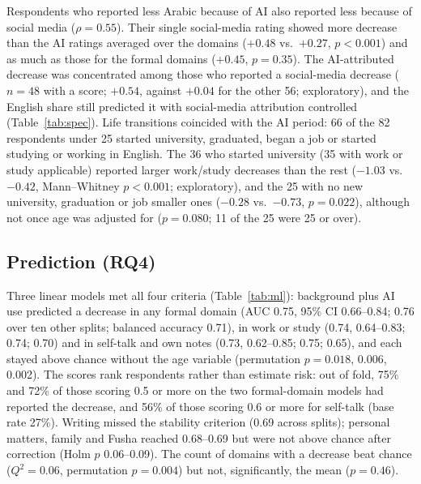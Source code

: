 \documentclass[conference]{IEEEtran}
\begin{document}
Respondents who reported less Arabic because of AI also reported less because of social media ($\rho=0.55$). Their single social-media rating showed more decrease than the AI ratings averaged over the domains ($+0.48$ vs.\ $+0.27$, $p<0.001$) and as much as those for the formal domains ($+0.45$, $p=0.35$). The AI-attributed decrease was concentrated among those who reported a social-media decrease ($n=48$ with a score; $+0.54$, against $+0.04$ for the other 56; exploratory), and the English share still predicted it with social-media attribution controlled (Table~\ref{tab:spec}). Life transitions coincided with the AI period: 66 of the 82 respondents under 25 started university, graduated, began a job or started studying or working in English. The 36 who started university (35 with work or study applicable) reported larger work/study decreases than the rest ($-1.03$ vs.\ $-0.42$, Mann--Whitney $p<0.001$; exploratory), and the 25 with no new university, graduation or job smaller ones ($-0.28$ vs.\ $-0.73$, $p=0.022$), although not once age was adjusted for ($p=0.080$; 11 of the 25 were 25 or over).

\subsection{Prediction (RQ4)}

Three linear models met all four criteria (Table~\ref{tab:ml}): background plus AI use predicted a decrease in any formal domain (AUC 0.75, 95\% CI 0.66--0.84; 0.76 over ten other splits; balanced accuracy 0.71), in work or study (0.74, 0.64--0.83; 0.74; 0.70) and in self-talk and own notes (0.73, 0.62--0.85; 0.75; 0.65), and each stayed above chance without the age variable (permutation $p=0.018$, 0.006, 0.002). The scores rank respondents rather than estimate risk: out of fold, 75\% and 72\% of those scoring 0.5 or more on the two formal-domain models had reported the decrease, and 56\% of those scoring 0.6 or more for self-talk (base rate 27\%). Writing missed the stability criterion (0.69 across splits); personal matters, family and Fusha reached 0.68--0.69 but were not above chance after correction (Holm $p$ 0.06--0.09). The count of domains with a decrease beat chance ($Q^2=0.06$, permutation $p=0.004$) but not, significantly, the mean ($p=0.46$).
\end{document}
